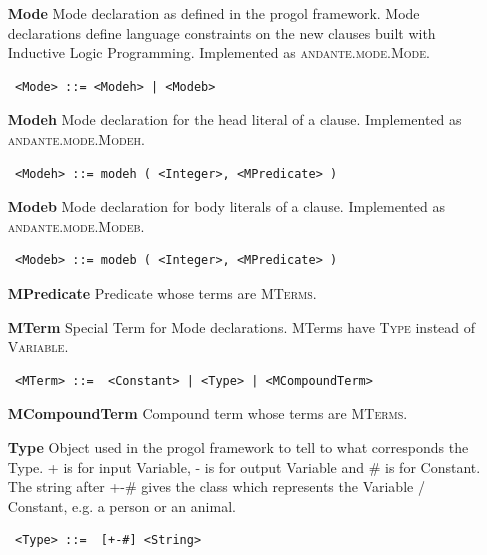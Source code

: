 \documentclass{article}
\begin{document}
\begin{itemize}

    \item[\textbf{Mode}] Mode declaration as defined in the progol framework. 
        Mode declarations define language constraints on the new clauses built 
        with Inductive Logic Programming.
        Implemented as \textsc{andante.mode.Mode}.
        \begin{verbatim} <Mode> ::= <Modeh> | <Modeb> \end{verbatim}

    \item[\textbf{Modeh}] Mode declaration for the head literal of a clause.
        Implemented as \textsc{andante.mode.Modeh}.
        \begin{verbatim} <Modeh> ::= modeh ( <Integer>, <MPredicate> ) \end{verbatim}

    \item[\textbf{Modeb}] Mode declaration for body literals of a clause.
        Implemented as \textsc{andante.mode.Modeb}.
        \begin{verbatim} <Modeb> ::= modeb ( <Integer>, <MPredicate> ) \end{verbatim}

    \item[\textbf{MPredicate}] Predicate whose terms are \textsc{MTerms}.

    \item[\textbf{MTerm}] Special Term for Mode declarations. MTerms have
        \textsc{Type} instead of \textsc{Variable}.
        \begin{verbatim} <MTerm> ::=  <Constant> | <Type> | <MCompoundTerm> \end{verbatim}

    \item[\textbf{MCompoundTerm}] Compound term whose terms are \textsc{MTerms}.

    \item[\textbf{Type}] Object used in the progol framework to tell to what
        corresponds the Type. \textsc{+} is for input Variable, \textsc{-} is
        for output Variable and \textsc{\#} is for Constant.
        The string after \textsc{+-\#} gives the class which represents the 
        Variable / Constant, e.g. a person or an animal.
        \begin{verbatim} <Type> ::=  [+-#] <String> \end{verbatim}
\end{itemize}
\end{document}
